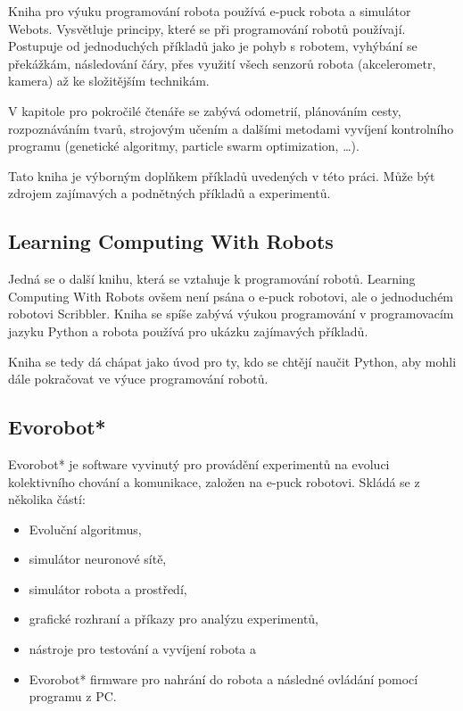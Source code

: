 \documentclass[12pt,notitlepage]{report}
\begin{document}
        Kniha pro výuku programování robota používá e-puck robota a simulátor
        Webots. Vysvětluje principy, které se při programování robotů
        používají. Postupuje od jednoduchých příkladů jako je pohyb s robotem,
        vyhýbání se překážkám, následování čáry, přes využití všech senzorů
        robota (akcelerometr, kamera) až ke složitějším technikám.

        V kapitole pro pokročilé čtenáře se zabývá odometrií, plánováním cesty,
        rozpoznáváním tvarů, strojovým učením a dalšími metodami vyvíjení
        kontrolního programu (genetické algoritmy, particle swarm optimization,
        \ldots).

        Tato kniha je výborným doplňkem příkladů uvedených v této práci. Může
        být zdrojem zajímavých a podnětných příkladů a experimentů.

        \subsection{Learning Computing With Robots}
        \label{learning-computing}

        Jedná se o další knihu, která se vztahuje k programování robotů.
        Learning Computing With Robots \cite{learning} ovšem není psána o e-puck
        robotovi, ale o jednoduchém robotovi Scribbler. Kniha se spíše zabývá
        výukou programování v programovacím jazyku Python a robota používá pro
        ukázku zajímavých příkladů.

        Kniha se tedy dá chápat jako úvod pro ty, kdo se chtějí naučit Python,
        aby mohli dále pokračovat ve výuce programování robotů.

        \subsection{Evorobot*}
        \label{evorobot*}

        Evorobot* je software vyvinutý pro provádění experimentů na evoluci
        kolektivního chování a komunikace, založen na e-puck robotovi. Skládá
        se z několika částí:

        \begin{itemize}
            \item Evoluční algoritmus,
            \item simulátor neuronové sítě,
            \item simulátor robota a prostředí,
            \item grafické rozhraní a příkazy pro analýzu experimentů,
            \item nástroje pro testování a vyvíjení robota a
            \item Evorobot* firmware pro nahrání do robota a následné ovládání pomocí programu z PC.
        \end{itemize}
\end{document}
